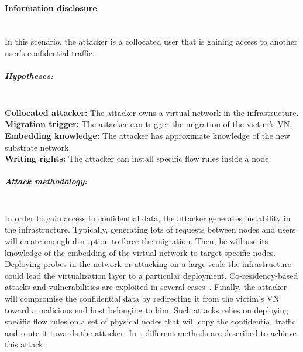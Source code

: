 \paragraph{Information disclosure}\textbf{\\}
In this scenario, the attacker is a collocated user that is gaining access to another user's confidential traffic. 
\subparagraph{Hypotheses:}\textbf{\\}
\textbf{Collocated attacker:} The attacker owns a virtual network in the infrastructure.\\
\textbf{Migration trigger:} The attacker can trigger the migration of the victim's VN.\\
\textbf{Embedding knowledge:} The attacker has approximate knowledge of the new substrate network.\\
\textbf{Writing rights:} The attacker can install specific flow rules inside a node.

\subparagraph{Attack methodology:}\textbf{\\}
In order to gain access to confidential data, the attacker generates instability in the infrastructure. Typically, generating lots of requests between nodes and users will create enough disruption to force the migration.
Then, he will use its knowledge of the embedding of the virtual network to target specific nodes.
Deploying probes in the network or attacking on a large scale the infrastructure could lead the virtualization layer to a particular deployment. Co-residency-based attacks and vulnerabilities are exploited in several cases~\cite{malicious-atya2017,nomad-Moon2015b,getoffmucloud-Ristenpart2009,stalling-atya2017}.
Finally, the attacker will compromise the confidential data by redirecting it from the victim's VN toward a malicious end host belonging to him.
Such attacks relies on deploying specific flow rules on a set of physical nodes that will copy the confidential traffic and route it towards the attacker.
In~\cite{Costa2015,Sphinx-Dhawan2015}, different methods are described to achieve this attack. 

